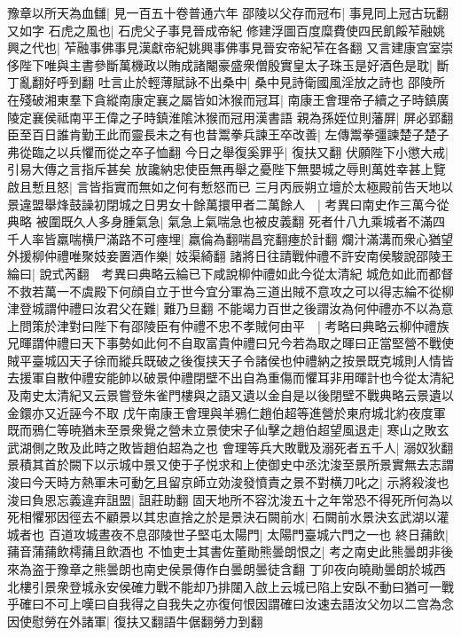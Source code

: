豫章以所天為血讎|{
	見一百五十卷普通六年}
邵陵以父存而冠布|{
	事見同上冠古玩翻又如字}
石虎之風也|{
	石虎父子事見晉成帝紀}
修建浮圖百度糜費使四民飢餒苲融姚興之代也|{
	苲融事佛事見漢獻帝紀姚興事佛事見晉安帝紀苲在各翻}
又言建康宫室崇侈陛下唯與主書參斷萬機政以賄成諸閹豪盛衆僧殷實皇太子珠玉是好酒色是耽|{
	斷丁亂翻好呼到翻}
吐言止於輕薄賦詠不出桑中|{
	桑中見詩衛國風淫放之詩也}
邵陵所在殘破湘東羣下貪縱南康定襄之屬皆如沐猴而冠耳|{
	南康王會理帝子續之子時鎮廣陵定襄侯祗南平王偉之子時鎮淮隂沐猴而冠用漢書語}
親為孫姪位則藩屏|{
	屏必郢翻}
臣至百日誰肯勤王此而靈長未之有也昔鬻拳兵諫王卒改善|{
	左傳鬻拳彊諫楚子楚子弗從臨之以兵懼而從之卒子恤翻}
今日之舉復奚罪乎|{
	復扶又翻}
伏願陛下小懲大戒|{
	引易大傳之言指斥甚矣}
放讒納忠使臣無再舉之憂陛下無嬰城之辱則萬姓幸甚上覽啟且慙且怒|{
	言皆指實而無如之何有慙怒而已}
三月丙辰朔立壇於太極殿前告天地以景違盟舉烽鼓譟初閉城之日男女十餘萬擐甲者二萬餘人　|{
	考異曰南史作三萬今從典略}
被圍既久人多身腫氣急|{
	氣急上氣喘急也被皮義翻}
死者什八九乘城者不滿四千人率皆羸喘横尸滿路不可瘞埋|{
	羸倫為翻喘昌兖翻瘞於計翻}
爛汁滿溝而衆心猶望外援柳仲禮唯聚妓妾置酒作樂|{
	妓渠綺翻}
諸將日往請戰仲禮不許安南侯駿說邵陵王綸曰|{
	說式芮翻　考異曰典略云綸已下咸說柳仲禮如此今從太清紀}
城危如此而都督不救若萬一不虞殿下何顔自立于世今宜分軍為三道出賊不意攻之可以得志綸不從柳津登城謂仲禮曰汝君父在難|{
	難乃旦翻}
不能竭力百世之後謂汝為何仲禮亦不以為意上問策於津對曰陛下有邵陵臣有仲禮不忠不孝賊何由平　|{
	考略曰典略云柳仲禮族兄暉謂仲禮曰天下事勢如此何不自取富貴仲禮曰兄今若為取之暉曰正當堅營不戰使賊平臺城囚天子徐而縱兵既破之後復挟天子令諸侯也仲禮納之按景既克城則人情皆去援軍自散仲禮安能帥以破景仲禮閉壁不出自為重傷而懼耳非用暉計也今從太清紀及南史太清紀又云景嘗登朱雀門樓與之語又遺以金自是以後閉壁不戰典略云景遺以金鐶亦又近誣今不取}
戊午南康王會理與羊鴉仁趙伯超等進營於東府城北約夜度軍既而鴉仁等暁猶未至景衆覺之營未立景使宋子仙擊之趙伯超望風退走|{
	寒山之敗玄武湖側之敗及此時之敗皆趙伯超為之也}
會理等兵大敗戰及溺死者五千人|{
	溺奴狄翻}
景積其首於闕下以示城中景又使于子悦求和上使御史中丞沈浚至景所景實無去志謂浚曰今天時方熱軍未可動乞且留京師立効浚發憤責之景不對横刀叱之|{
	示將殺浚也}
浚曰負恩忘義違弃詛盟|{
	詛莊助翻}
固天地所不容沈浚五十之年常恐不得死所何為以死相懼邪因徑去不顧景以其忠直捨之於是景決石闕前水|{
	石闕前水景決玄武湖以灌城者也}
百道攻城晝夜不息邵陵世子堅屯太陽門|{
	太陽門臺城六門之一也}
終日蒱飲|{
	蒱音蒲蒱飲樗蒱且飲酒也}
不恤吏士其書佐董勛熊曇朗恨之|{
	考之南史此熊曇朗非後來為盗于豫章之熊曇朗也南史侯景傳作白曇朗曇徒含翻}
丁卯夜向曉勛曇朗於城西北樓引景衆登城永安侯確力戰不能却乃排闥入啟上云城已陷上安臥不動曰猶可一戰乎確曰不可上嘆曰自我得之自我失之亦復何恨因謂確曰汝速去語汝父勿以二宫為念因使慰勞在外諸軍|{
	復扶又翻語牛倨翻勞力到翻}
